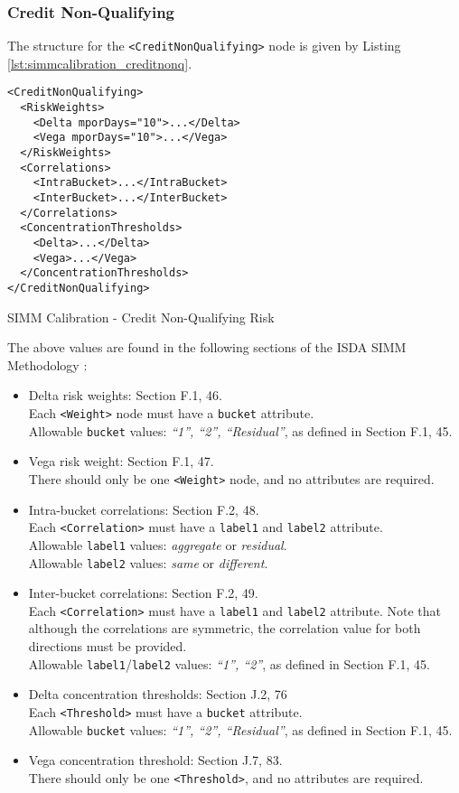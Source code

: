 \subsubsection{Credit Non-Qualifying}
The structure for the {\tt <CreditNonQualifying>} node is given by Listing \ref{lst:simmcalibration_creditnonq}.

\begin{listing}[H]
\begin{verbatim}
<CreditNonQualifying>
  <RiskWeights>
    <Delta mporDays="10">...</Delta>
    <Vega mporDays="10">...</Vega>
  </RiskWeights>
  <Correlations>
    <IntraBucket>...</IntraBucket>
    <InterBucket>...</InterBucket>
  </Correlations>
  <ConcentrationThresholds>
    <Delta>...</Delta>
    <Vega>...</Vega>
  </ConcentrationThresholds>
</CreditNonQualifying>
\end{verbatim}
\caption{SIMM Calibration - Credit Non-Qualifying Risk}
\label{lst:simmcalibration_creditnonq}
\end{listing}

The above values are found in the following sections of the ISDA SIMM Methodology \cite{SIMM2.5A}:
\begin{itemize}
  \item Delta risk weights: Section F.1, 46. \\
    Each {\tt <Weight>} node must have a {\tt bucket} attribute.\\
    Allowable {\tt bucket} values: \emph{``1'', ``2'', ``Residual''}, as defined in Section F.1, 45.
  \item Vega risk weight: Section F.1, 47. \\
    There should only be one {\tt <Weight>} node, and no attributes are required.
  \item Intra-bucket correlations: Section F.2, 48. \\
    Each {\tt <Correlation>} must have a {\tt label1} and {\tt label2} attribute. \\
    Allowable {\tt label1} values: \emph{aggregate} or \emph{residual}. \\
    Allowable {\tt label2} values: \emph{same} or \emph{different}.
  \item Inter-bucket correlations: Section F.2, 49. \\
    Each {\tt <Correlation>} must have a {\tt label1} and {\tt label2} attribute. Note that although the correlations
    are symmetric, the correlation value for both directions must be provided. \\
    Allowable {\tt label1}/{\tt label2} values: \emph{``1'', ``2''}, as defined in Section F.1, 45.
  \item Delta concentration thresholds: Section J.2, 76 \\
    Each {\tt <Threshold>} must have a {\tt bucket} attribute. \\
    Allowable {\tt bucket} values: \emph{``1'', ``2'', ``Residual''}, as defined in Section F.1, 45.
  \item Vega concentration threshold: Section J.7, 83. \\
    There should only be one {\tt <Threshold>}, and no attributes are required.
\end{itemize}

